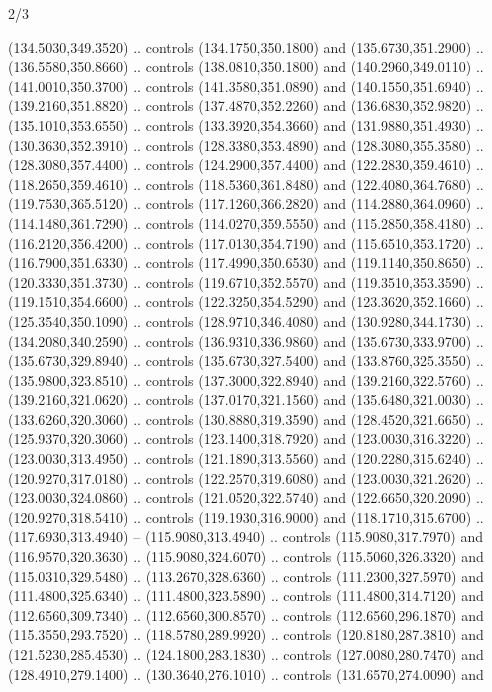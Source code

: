\begin{flagdescription}{2/3}
\begin{scope}[shift={(0.5\flaglength,0.5)},scale=\flagwidth/480]
\begin{scope}[y=0.8pt, x=0.80pt, yscale=-1,shift={(-450,-300)}]
\begin{scope}[cm={{1.02948,0.0,0.0,1.02948,(-13.26599,6.99414)}}]
\begin{scope}[shift={(341.0917,90.34325)}]
  (134.5030,349.3520) .. controls (134.1750,350.1800) and (135.6730,351.2900) ..
  (136.5580,350.8660) .. controls (138.0810,350.1800) and (140.2960,349.0110) ..
  (141.0010,350.3700) .. controls (141.3580,351.0890) and (140.1550,351.6940) ..
  (139.2160,351.8820) .. controls (137.4870,352.2260) and (136.6830,352.9820) ..
  (135.1010,353.6550) .. controls (133.3920,354.3660) and (131.9880,351.4930) ..
  (130.3630,352.3910) .. controls (128.3380,353.4890) and (128.3080,355.3580) ..
  (128.3080,357.4400) .. controls (124.2900,357.4400) and (122.2830,359.4610) ..
  (118.2650,359.4610) .. controls (118.5360,361.8480) and (122.4080,364.7680) ..
  (119.7530,365.5120) .. controls (117.1260,366.2820) and (114.2880,364.0960) ..
  (114.1480,361.7290) .. controls (114.0270,359.5550) and (115.2850,358.4180) ..
  (116.2120,356.4200) .. controls (117.0130,354.7190) and (115.6510,353.1720) ..
  (116.7900,351.6330) .. controls (117.4990,350.6530) and (119.1140,350.8650) ..
  (120.3330,351.3730) .. controls (119.6710,352.5570) and (119.3510,353.3590) ..
  (119.1510,354.6600) .. controls (122.3250,354.5290) and (123.3620,352.1660) ..
  (125.3540,350.1090) .. controls (128.9710,346.4080) and (130.9280,344.1730) ..
  (134.2080,340.2590) .. controls (136.9310,336.9860) and (135.6730,333.9700) ..
  (135.6730,329.8940) .. controls (135.6730,327.5400) and (133.8760,325.3550) ..
  (135.9800,323.8510) .. controls (137.3000,322.8940) and (139.2160,322.5760) ..
  (139.2160,321.0620) .. controls (137.0170,321.1560) and (135.6480,321.0030) ..
  (133.6260,320.3060) .. controls (130.8880,319.3590) and (128.4520,321.6650) ..
  (125.9370,320.3060) .. controls (123.1400,318.7920) and (123.0030,316.3220) ..
  (123.0030,313.4950) .. controls (121.1890,313.5560) and (120.2280,315.6240) ..
  (120.9270,317.0180) .. controls (122.2570,319.6080) and (123.0030,321.2620) ..
  (123.0030,324.0860) .. controls (121.0520,322.5740) and (122.6650,320.2090) ..
  (120.9270,318.5410) .. controls (119.1930,316.9000) and (118.1710,315.6700) ..
  (117.6930,313.4940) -- (115.9080,313.4940) .. controls (115.9080,317.7970) and
  (116.9570,320.3630) .. (115.9080,324.6070) .. controls (115.5060,326.3320) and
  (115.0310,329.5480) .. (113.2670,328.6360) .. controls (111.2300,327.5970) and
  (111.4800,325.6340) .. (111.4800,323.5890) .. controls (111.4800,314.7120) and
  (112.6560,309.7340) .. (112.6560,300.8570) .. controls (112.6560,296.1870) and
  (115.3550,293.7520) .. (118.5780,289.9920) .. controls (120.8180,287.3810) and
  (121.5230,285.4530) .. (124.1800,283.1830) .. controls (127.0080,280.7470) and
  (128.4910,279.1400) .. (130.3640,276.1010) .. controls (131.6570,274.0090) and

\end{scope}
\end{scope}
\end{scope}
\end{scope}
\end{flagdescription}
